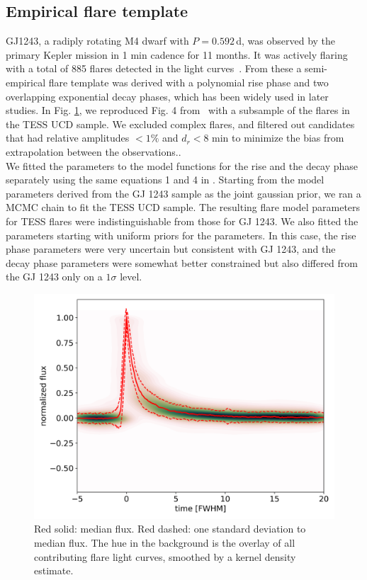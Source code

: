 \documentclass[twocolumn]{aastex62}
\begin{document}
\subsection{Empirical flare template}\label{subsec:template}
GJ1243, a radiply rotating M4 dwarf with $P=0.592$\,d, was observed by the primary Kepler mission in 1 min cadence for 11 months. It was actively flaring with a total of 885 flares detected in the light curves~\citep{davenport2014}. From these a semi-empirical flare template was derived with a polynomial rise phase and two overlapping exponential decay phases, which has been widely used in later studies. In Fig. \ref{fig:template}, we reproduced Fig. 4 from~\citet{davenport2014} with a subsample of the flares in the TESS UCD sample. We excluded complex flares, and filtered out candidates that had relative amplitudes $<1\%$ and $d_r<8$ min to minimize the bias from extrapolation between the observations..
\\
We fitted the parameters to the model functions for the rise and the decay phase separately using the same equations 1 and 4 in \citet{davenport2014}. Starting from the model parameters derived from the GJ 1243 sample as the joint gaussian prior, we ran a MCMC chain to fit the TESS UCD sample. The resulting flare model parameters for TESS flares were indistinguishable from those for GJ 1243. We also fitted the parameters starting with uniform priors for the parameters. In this case, the rise phase parameters were very uncertain but consistent with GJ 1243, and the decay phase parameters were somewhat better constrained but also differed from the GJ 1243 only on a $1\sigma$ level. 
\begin{figure}
	\includegraphics[width=\columnwidth]{18_03_2020_11_11_all_davenport_fit_median_norel_long.png}
    \caption{Red solid: median flux. Red dashed: one standard deviation to median flux. The hue in the background is the overlay of all contributing flare light curves, smoothed by a kernel density estimate.}
    \label{fig:template}
\end{figure}
\end{document}
